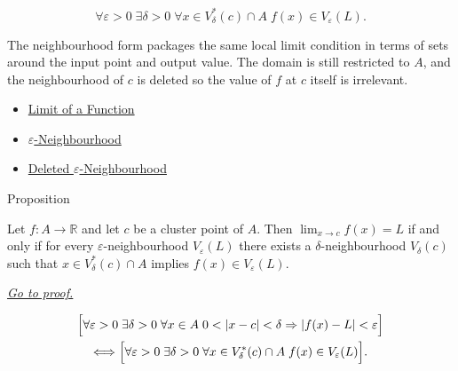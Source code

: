 \begin{remark*}
\[
  \forall\varepsilon>0\;\exists\delta>0\;\forall x\in V_\delta^*(c)\cap A\;
  f(x)\in V_\varepsilon(L).
\]
\end{remark*}

\begin{remark*}[Interpretation]
The neighbourhood form packages the same local limit condition in
terms of sets around the input point and output value. The domain is
still restricted to $A$, and the neighbourhood of $c$ is deleted so
the value of $f$ at $c$ itself is irrelevant.
\end{remark*}

\begin{dependencies}
\begin{itemize}
  \item \hyperref[def:limit-function]{Limit of a Function}
  \item \hyperref[def:epsilon-neighbourhood]{$\varepsilon$-Neighbourhood}
  \item \hyperref[def:deleted-epsilon-neighbourhood]{Deleted $\varepsilon$-Neighbourhood}
\end{itemize}
\end{dependencies}


\begin{propositionbox}{Proposition}
\begin{proposition}
\label{prop:limit-neighbourhood-equiv}
Let $f : A \to \mathbb{R}$ and let $c$ be a cluster point of $A$.
Then $\lim_{x\to c}f(x)=L$ if and only if for every
$\varepsilon$-neighbourhood $V_\varepsilon(L)$ there exists a
$\delta$-neighbourhood $V_\delta(c)$ such that
$x\in V_\delta^*(c)\cap A$ implies $f(x)\in V_\varepsilon(L)$.

\smallskip\noindent
\hyperref[prf:limit-neighbourhood-equiv]{\textit{Go to proof.}}
\end{proposition}
\end{propositionbox}

\begin{remark*}
\[
\begin{aligned}
&\Bigl[\forall\varepsilon>0\;\exists\delta>0\;\forall x\in A\;
  0<|x-c|<\delta\Rightarrow |f(x)-L|<\varepsilon\Bigr] \\
&\quad\Longleftrightarrow
\Bigl[\forall\varepsilon>0\;\exists\delta>0\;\forall x\in V_\delta^*(c)\cap A\;
  f(x)\in V_\varepsilon(L)\Bigr].
\end{aligned}
\]
\end{remark*}

